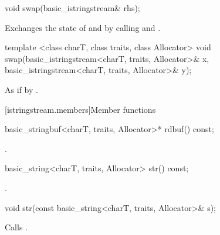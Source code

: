 %
\begin{itemdecl}
void swap(basic_istringstream& rhs);
\end{itemdecl}

\begin{itemdescr}
\pnum
\effects Exchanges the state of  and
 by calling
 and
.
\end{itemdescr}


%
\begin{itemdecl}
template <class charT, class traits, class Allocator>
  void swap(basic_istringstream<charT, traits, Allocator>& x,
            basic_istringstream<charT, traits, Allocator>& y);
\end{itemdecl}

\begin{itemdescr}
\pnum
\effects As if by .
\end{itemdescr}

[istringstream.members]{Member functions}

%
\begin{itemdecl}
basic_stringbuf<charT, traits, Allocator>* rdbuf() const;
\end{itemdecl}

\begin{itemdescr}
\pnum
\returns
{}.
\end{itemdescr}

%
\begin{itemdecl}
basic_string<charT, traits, Allocator> str() const;
\end{itemdecl}

\begin{itemdescr}
\pnum
\returns
{}.
\end{itemdescr}

%
\begin{itemdecl}
void str(const basic_string<charT, traits, Allocator>& s);
\end{itemdecl}

\begin{itemdescr}
\pnum
\effects
Calls
.
\end{itemdescr}

